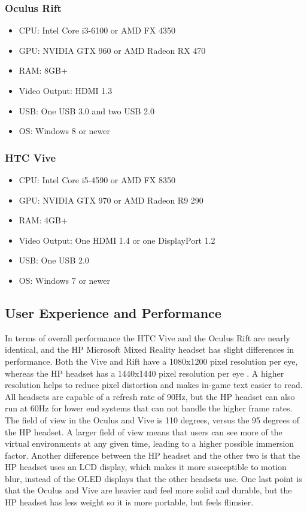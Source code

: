 \documentclass[onecolumn, draftclsnofoot,10pt, compsoc]{IEEEtran}
\begin{document}
\subsubsection{Oculus Rift}
\begin{itemize}
    \item CPU: Intel Core i3-6100 or AMD FX 4350
    \item GPU: NVIDIA GTX 960 or AMD Radeon RX 470
    \item RAM: 8GB+
    \item Video Output: HDMI 1.3
    \item USB: One USB 3.0 and two USB 2.0
    \item OS: Windows 8 or newer
\end{itemize}

\subsubsection{HTC Vive}
\begin{itemize}
    \item CPU: Intel Core i5-4590 or AMD FX 8350
    \item GPU: NVIDIA GTX 970 or AMD Radeon R9 290
    \item RAM: 4GB+
    \item Video Output: One HDMI 1.4 or one DisplayPort 1.2
    \item USB: One USB 2.0
    \item OS: Windows 7 or newer
\end{itemize}

\subsection{User Experience and Performance}
In terms of overall performance the HTC Vive and the Oculus Rift are nearly identical, and the HP Microsoft Mixed Reality headset has slight differences in performance. Both the Vive and Rift have a 1080x1200 pixel resolution per eye, whereas the HP headset has a 1440x1440 pixel resolution per eye \cite{headsetCompare}. A higher resolution helps to reduce pixel distortion and makes in-game text easier to read. All headsets are capable of a refresh rate of 90Hz, but the HP headset can also run at 60Hz for lower end systems that can not handle the higher frame rates. The field of view in the Oculus and Vive is 110 degrees, versus the 95 degrees of the HP headset. A larger field of view means that users can see more of the virtual environments at any given time, leading to a higher possible immersion factor. Another difference between the HP headset and the other two is that the HP headset uses an LCD display, which makes it more susceptible to motion blur, instead of the OLED displays that the other headsets use. One last point is that the Oculus and Vive are heavier and feel more solid and durable, but the HP headset has less weight so it is more portable, but feels flimsier. 
\end{document}

